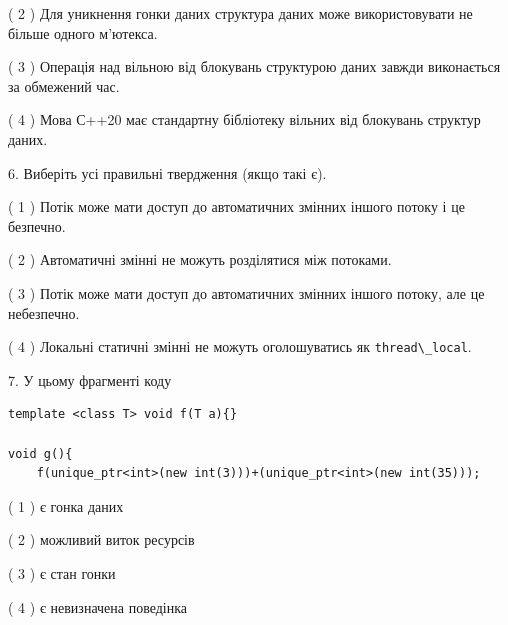 \documentclass[12pt, ukrainian]{article}
\def\code#1{\Verb!#1!}
\begin{document}
\begin {large}
{( 2 ) Для уникнення гонки даних структура даних може використовувати не більше одного м’ютекса.%

( 3 ) Операція над вільною від блокувань структурою даних завжди виконається за обмежений час.%

( 4 ) Мова С++20 має стандартну бібліотеку вільних від блокувань структур даних.%
\newpage



\vspace{5mm}
6. Виберіть усі правильні твердження (якщо такі є).\par
\vspace{2mm}

( 1 ) Потік може мати доступ до автоматичних змінних іншого потоку і це безпечно.%

( 2 ) Автоматичні змінні не можуть розділятися між потоками.%

( 3 ) Потік може мати доступ до автоматичних змінних іншого потоку, але це небезпечно.%

( 4 ) Локальні статичні змінні не можуть оголошуватись як \code{thread\_local}.%


\vspace{5mm}
7. У цьому фрагменті коду
\begin{verbatim}
template <class T> void f(T a){}

void g(){
    f(unique_ptr<int>(new int(3)))+(unique_ptr<int>(new int(35)));
\end{verbatim}

( 1 ) є гонка даних%

( 2 ) можливий виток ресурсів%

( 3 ) є стан гонки%

( 4 ) є невизначена поведінка%
}
\end {large}
\end{document}

